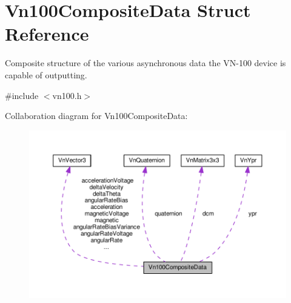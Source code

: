 \hypertarget{structVn100CompositeData}{}\section{Vn100\+Composite\+Data Struct Reference}
\label{structVn100CompositeData}


Composite structure of the various asynchronous data the V\+N-\/100 device is capable of outputting.  




{\ttfamily \#include $<$vn100.\+h$>$}



Collaboration diagram for Vn100\+Composite\+Data\+:
\nopagebreak
\begin{figure}[H]
\begin{center}
\leavevmode
\includegraphics[width=350pt]{structVn100CompositeData__coll__graph}
\end{center}
\end{figure}
